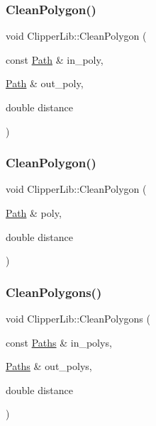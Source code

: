 \mbox{\label{namespace_clipper_lib_a9246a3146ac112581e82be58e158be7b}} 
\subsubsection{\texorpdfstring{CleanPolygon()}{CleanPolygon()}\hspace{0.1cm}{\footnotesize\ttfamily [1/2]}}
{\footnotesize\ttfamily void Clipper\+Lib\+::\+Clean\+Polygon (\begin{DoxyParamCaption}\item[{const \mbox{\hyperlink{namespace_clipper_lib_af39c8fe00f278f18cc8142fef41242da}{Path}} \&}]{in\+\_\+poly,  }\item[{\mbox{\hyperlink{namespace_clipper_lib_af39c8fe00f278f18cc8142fef41242da}{Path}} \&}]{out\+\_\+poly,  }\item[{double}]{distance }\end{DoxyParamCaption})}

\mbox{\label{namespace_clipper_lib_a819f3ac34feed7ca8c64c54bc534eb1b}} 
\subsubsection{\texorpdfstring{CleanPolygon()}{CleanPolygon()}\hspace{0.1cm}{\footnotesize\ttfamily [2/2]}}
{\footnotesize\ttfamily void Clipper\+Lib\+::\+Clean\+Polygon (\begin{DoxyParamCaption}\item[{\mbox{\hyperlink{namespace_clipper_lib_af39c8fe00f278f18cc8142fef41242da}{Path}} \&}]{poly,  }\item[{double}]{distance }\end{DoxyParamCaption})}

\mbox{\label{namespace_clipper_lib_a770cbc6ce4f16d02b8fe27c5abf6159c}} 
\subsubsection{\texorpdfstring{CleanPolygons()}{CleanPolygons()}\hspace{0.1cm}{\footnotesize\ttfamily [1/2]}}
{\footnotesize\ttfamily void Clipper\+Lib\+::\+Clean\+Polygons (\begin{DoxyParamCaption}\item[{const \mbox{\hyperlink{namespace_clipper_lib_a4bab1d9e10805fa6f1fd3b78c56efcfe}{Paths}} \&}]{in\+\_\+polys,  }\item[{\mbox{\hyperlink{namespace_clipper_lib_a4bab1d9e10805fa6f1fd3b78c56efcfe}{Paths}} \&}]{out\+\_\+polys,  }\item[{double}]{distance }\end{DoxyParamCaption})}

